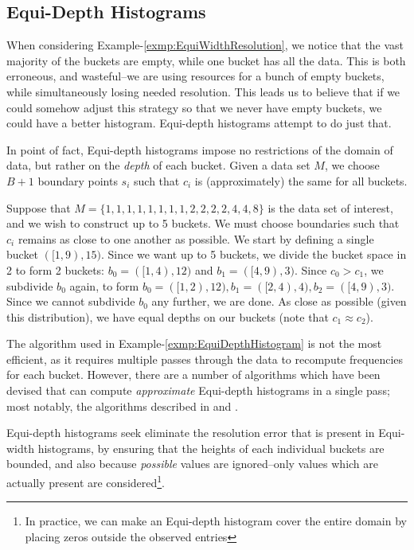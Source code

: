 \subsection{Equi-Depth Histograms}
\label{sec:EquiDepth}
When considering Example-\ref{exmp:EquiWidthResolution}, we notice that the vast majority of the buckets are empty, while one bucket has all the data. This is both erroneous, and wasteful--we are using resources for a bunch of empty buckets, while simultaneously losing needed resolution. This leads us to believe that if we could somehow adjust this strategy so that we never have empty buckets, we could have a better histogram. Equi-depth histograms attempt to do just that.

In point of fact, Equi-depth histograms impose no restrictions of the domain of data, but rather on the \emph{depth} of each bucket. Given a data set $M$, we choose $B+1$ boundary points $s_i$ such that $c_i$ is (approximately) the same for all buckets.

\begin{exmp}
				\label{exmp:EquiDepthHistogram}
Suppose that $M =\lbrace 1,1,1,1,1,1,1,1,2,2,2,2,4,4,8\rbrace$ is the data set of interest, and we wish to construct up to 5 buckets. We must choose boundaries such that $c_i$ remains as close to one another as possible. We start by defining a single bucket $([1,9),15)$. Since we want up to 5 buckets, we divide the bucket space in 2 to form 2 buckets: $b_0 = ([1,4),12)$ and $b_1 = ([4,9),3)$. Since $c_0 > c_1$, we subdivide $b_0$ again, to form $b_0 = ([1,2),12),b_1 = ([2,4),4),b_2=([4,9),3)$. Since we cannot subdivide $b_0$ any further, we are done. As close as possible (given this distribution), we have equal depths on our buckets (note that $c_1 \approx c_2$).
\end{exmp}

The algorithm used in Example-\ref{exmp:EquiDepthHistogram} is not the most efficient, as it requires multiple passes through the data to recompute frequencies for each bucket. However, there are a number of algorithms which have been devised that can compute \emph{approximate} Equi-depth histograms in a single pass; most notably, the algorithms described in \cite{MousaviEquiDepthDataStreams} and \cite{GibbonsFastIncremental}.

Equi-depth histograms seek eliminate the resolution error that is present in Equi-width histograms, by ensuring that the heights of each individual buckets are bounded, and also because \emph{possible} values are ignored--only values which are actually present are considered\footnote{In practice, we can make an Equi-depth histogram cover the entire domain by placing zeros outside the observed entries}.

